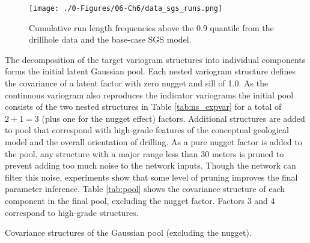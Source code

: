 \begin{figure}[htb!]
    \centering
    \texttt{[image: ./0-Figures/06-Ch6/data\_sgs\_runs.png]}
    \caption{Cumulative run length frequencies above the 0.9 quantile from the drillhole data and the base-case \gls{SGS} model.}
    \label{fig:data_sgs_runs}
\end{figure}

The decomposition of the target variogram structures into individual components forms the initial latent Gaussian pool. Each nested variogram structure defines the covariance of a latent factor with zero nugget and sill of 1.0. As the continuous variogram also reproduces the indicator variograms the initial pool consists of the two nested structures in Table \ref{tab:ns_expvar} for a total of $2 + 1 = 3$ (plus one for the nugget effect) factors. Additional structures are added to pool that correspond with high-grade features of the conceptual geological model and the overall orientation of drilling. As a pure nugget factor is added to the pool, any structure with a major range less than 30 meters is pruned to prevent adding too much noise to the network inputs. Though the network can filter this noise, experiments show that some level of pruning improves the final parameter inference. Table \ref{tab:pool} shows the covariance structure of each component in the final pool, excluding the nugget factor. Factors 3 and 4 correspond to high-grade structures.



\begin{table}[!htb]
    \centering
    \caption{Covariance structures of the Gaussian pool (excluding the nugget).}
    \resizebox{0.9\width}{!}{}
    \label{tab:pool}
\end{table}

